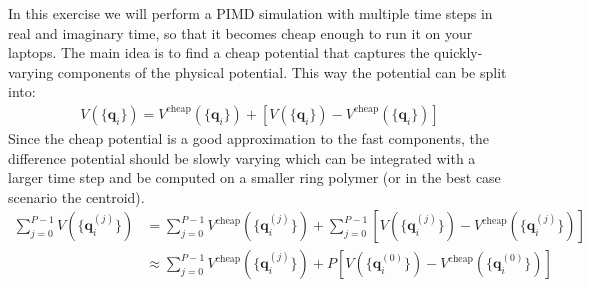 \documentclass{article}
\begin{document}
\begin{Exercise}[label={water},title={Multiple time steps with an \emph{ab initio} potential}]
In this exercise we will perform a PIMD simulation  with multiple time steps in real and imaginary time, so that it becomes cheap enough to run it on your laptops. The main idea is to find a cheap potential that captures the quickly-varying components of the physical potential. This way the potential can be split into:
\begin{align*}
    V(\{\textbf{q}_i\}) = V^{\text{cheap}}(\{\textbf{q}_i\}) + [V(\{\textbf{q}_i\}) - V^{\text{cheap}}(\{\textbf{q}_i\})]
\end{align*}
Since the cheap potential is a good approximation to the fast components, the difference potential should be slowly varying which can be integrated with a larger time step and be computed on a smaller ring polymer (or in the best case scenario the centroid).
\begin{align*}
    \sum_{j=0}^{P-1} V(\{\textbf{q}_i^{(j)}\}) & = \sum_{j=0}^{P-1} V^{\text{cheap}}(\{\textbf{q}_i^{(j)}\}) + \sum_{j=0}^{P-1} [V(\{\textbf{q}_i^{(j)}\}) - V^{\text{cheap}}(\{\textbf{q}_i^{(j)}\})] \\
    & \approx \sum_{j=0}^{P-1} V^{\text{cheap}}(\{\textbf{q}_i^{(j)}\}) +  P [V(\{\textbf{q}_i^{(0)}\}) - V^{\text{cheap}}(\{\textbf{q}_i^{(0)}\})]
\end{align*}


\end{Exercise}
\end{document}
